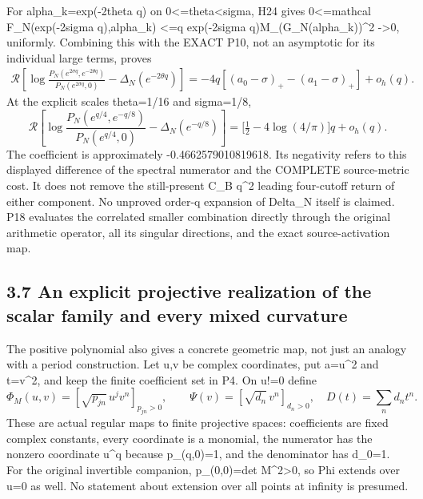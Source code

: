 For alpha\_k=exp(-2theta q) on 0\textless=theta\textless sigma, H24 gives 0\textless=mathcal F\_N(exp(-2sigma q),alpha\_k) \textless=q exp(-2sigma q)\textbar\textbar M\textbar\textbar\_(G\_N(alpha\_k))\^{}2 -\textgreater0, uniformly. Combining this with the EXACT P10, not an asymptotic for its individual large terms, proves \[
 \boxed{\begin{aligned}
 \mathcal R\left[
 \log\frac{P_N(e^{2\sigma q},e^{-2\theta q})}{P_N(e^{2\sigma q},0)}
 -\Delta_N(e^{-2\theta q})\right]
 =-4q[(a_0-\sigma)_+-(a_1-\sigma)_+]+o_h(q).
 \end{aligned}}\tag{P17}
\] At the explicit scales theta=1/16 and sigma=1/8, \[
 \boxed{\mathcal R\left[
 \log\frac{P_N(e^{q/4},e^{-q/8})}{P_N(e^{q/4},0)}
 -\Delta_N(e^{-q/8})\right]
 =\bigl[\tfrac12-4\log(4/\pi)\bigr]q+o_h(q).}\tag{P18}
\] The coefficient is approximately -0.4662579010819618. Its negativity refers to this displayed difference of the spectral numerator and the COMPLETE source-metric cost. It does not remove the still-present C\_B q\^{}2 leading four-cutoff return of either component. No unproved order-q expansion of Delta\_N itself is claimed. P18 evaluates the correlated smaller combination directly through the original arithmetic operator, all its singular directions, and the exact source-activation map.

\subsection{3.7 An explicit projective realization of the scalar family and every mixed curvature}\label{an-explicit-projective-realization-of-the-scalar-family-and-every-mixed-curvature}

The positive polynomial also gives a concrete geometric map, not just an analogy with a period construction. Let u,v be complex coordinates, put a=\textbar u\textbar\^{}2 and t=\textbar v\textbar\^{}2, and keep the finite coefficient set in P4. On u!=0 define \[
 \Phi_M(u,v)=[\sqrt{p_{jn}}\,u^jv^n]_{p_{jn}>0},\qquad
 \Psi(v)=[\sqrt{d_n}\,v^n]_{d_n>0},\quad D(t)=\sum_nd_nt^n.
 \tag{P19}
\] These are actual regular maps to finite projective spaces: coefficients are fixed complex constants, every coordinate is a monomial, the numerator has the nonzero coordinate u\^{}q because p\_(q,0)=1, and the denominator has d\_0=1. For the original invertible companion, p\_(0,0)=\textbar det M\textbar\^{}2\textgreater0, so Phi extends over u=0 as well. No statement about extension over all points at infinity is presumed.

